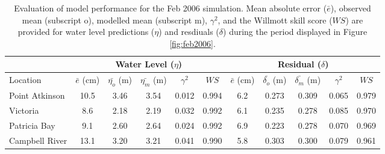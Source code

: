 \documentclass[pdftex,10pt]{article}
\begin{document}
\begin{table}[h]
\centering 
\begin{tabular}{|l |c c c c c | c c c c c|} 
\hline 
& \multicolumn{5}{|c|}{Water Level ($\eta$)}        & \multicolumn{5}{|c|}{Residual ($\delta$)} \\ 
\hline 
Location       & $\bar{e}$ (cm) & $\bar{\eta_{o}}$ (m) & $\bar{\eta_{m}}$ (m) & $\gamma^2$ & $WS$   & $\bar{e}$ (cm) & $\bar{\delta_{o}}$ (m) & $\bar{\delta_{m}}$ (m) & $\gamma^2$ & $WS$ \\
\hline 
Point Atkinson & 10.5           & 3.46                 & 3.54                 &   0.012    & 0.994  & 6.2            &  0.273                 & 0.309                  & 0.065     & 0.979     \\
Victoria       &  8.6           & 2.18                 & 2.19                 &   0.032    & 0.992  & 6.1            &  0.235                 & 0.278                  & 0.085     & 0.970     \\
Patricia Bay   &  9.1           & 2.60                 & 2.64                 &   0.024    & 0.992  & 6.9            &  0.223                 & 0.278                  & 0.070     & 0.969     \\
Campbell River & 13.1           & 3.20                 & 3.21                 &   0.041    & 0.990  & 5.8            &  0.303                 & 0.300                  & 0.079     & 0.961     \\
\hline 
\end{tabular}
\caption{Evaluation of model performance for the Feb 2006 simulation. Mean absolute error ($\bar{e}$), observed mean (subscript o), modelled mean (subscript m), $\gamma^2$, and the Willmott skill score ($WS$) are provided for water level predictions ($\eta$) and resdiuals ($\delta$) during the period displayed in Figure \ref{fig:feb2006}.}
\label{tab:feb2006stat} 
\end{table} 
\end{document}
